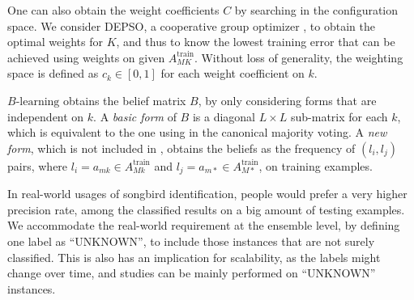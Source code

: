 One can also obtain the weight coefficients $C$ by searching in the configuration space. We consider DEPSO, a cooperative group optimizer \cite{xie2014cooperative}, to obtain the optimal weights for $K$, and thus to know the lowest training error that can be achieved using weights on given $A_{MK}^\text{train}$. Without loss of generality, the weighting space is defined as $c_k\in [0, 1]$ for each weight coefficient on $k$. 

$B\text{-learning}$ obtains the belief matrix $B$, by only considering forms that are independent on $k$. A \emph{basic form} of $B$ is a diagonal $L\times L$ sub-matrix for each $k$, which is equivalent to the one using in the canonical majority voting. A \emph{new form}, which is not included in \cite{rokach2010ensemble}, obtains the beliefs as the frequency of $(l_i, l_j)$ pairs, where $l_i=a_{mk} \in A_{Mk}^\text{train}$ and $l_j=a_{m*} \in A_{M*}^\text{train}$, on training examples.

In real-world usages of songbird identification, people would prefer a very higher precision rate, among the classified results on a big amount of testing examples. We accommodate the real-world requirement at the ensemble level, by defining one label as ``UNKNOWN'', to include those instances that are not surely classified. This is also has an implication for scalability, as the labels might change over time, and studies can be mainly performed on ``UNKNOWN'' instances.






